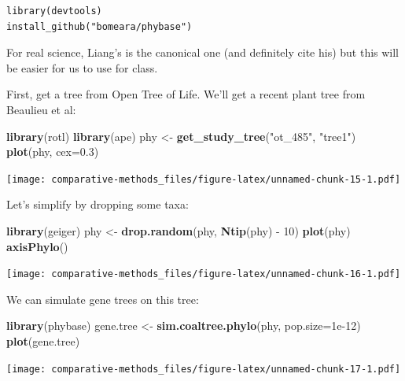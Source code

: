 \documentclass[]{book}
\newenvironment{Shaded}{\begin{snugshade}}{\end{snugshade}}
\newcommand{\KeywordTok}[1]{\textcolor[rgb]{0.13,0.29,0.53}{\textbf{{#1}}}}
\newcommand{\DataTypeTok}[1]{\textcolor[rgb]{0.13,0.29,0.53}{{#1}}}
\newcommand{\DecValTok}[1]{\textcolor[rgb]{0.00,0.00,0.81}{{#1}}}
\newcommand{\FloatTok}[1]{\textcolor[rgb]{0.00,0.00,0.81}{{#1}}}
\newcommand{\StringTok}[1]{\textcolor[rgb]{0.31,0.60,0.02}{{#1}}}
\newcommand{\NormalTok}[1]{{#1}}
\theoremstyle{definition}
\theoremstyle{definition}
\theoremstyle{remark}
\begin{document}
\begin{verbatim}
library(devtools)
install_github("bomeara/phybase")
\end{verbatim}

For real science, Liang's is the canonical one (and definitely cite his)
but this will be easier for us to use for class.

First, get a tree from Open Tree of Life. We'll get a recent plant tree
from Beaulieu et al:

\begin{Shaded}
\begin{Highlighting}[]
\KeywordTok{library}\NormalTok{(rotl)}
\KeywordTok{library}\NormalTok{(ape)}
\NormalTok{phy <-}\StringTok{ }\KeywordTok{get_study_tree}\NormalTok{(}\StringTok{"ot_485"}\NormalTok{, }\StringTok{"tree1"}\NormalTok{)}
\KeywordTok{plot}\NormalTok{(phy, }\DataTypeTok{cex=}\FloatTok{0.3}\NormalTok{)}
\end{Highlighting}
\end{Shaded}

\texttt{[image: comparative-methods\_files/figure-latex/unnamed-chunk-15-1.pdf]}

Let's simplify by dropping some taxa:

\begin{Shaded}
\begin{Highlighting}[]
\KeywordTok{library}\NormalTok{(geiger)}
\NormalTok{phy <-}\StringTok{ }\KeywordTok{drop.random}\NormalTok{(phy, }\KeywordTok{Ntip}\NormalTok{(phy) -}\StringTok{ }\DecValTok{10}\NormalTok{)}
\KeywordTok{plot}\NormalTok{(phy)}
\KeywordTok{axisPhylo}\NormalTok{()}
\end{Highlighting}
\end{Shaded}

\texttt{[image: comparative-methods\_files/figure-latex/unnamed-chunk-16-1.pdf]}

We can simulate gene trees on this tree:

\begin{Shaded}
\begin{Highlighting}[]
\KeywordTok{library}\NormalTok{(phybase)}
\NormalTok{gene.tree <-}\StringTok{ }\KeywordTok{sim.coaltree.phylo}\NormalTok{(phy, }\DataTypeTok{pop.size=}\FloatTok{1e-12}\NormalTok{)}
\KeywordTok{plot}\NormalTok{(gene.tree)}
\end{Highlighting}
\end{Shaded}

\texttt{[image: comparative-methods\_files/figure-latex/unnamed-chunk-17-1.pdf]}
\end{document}

